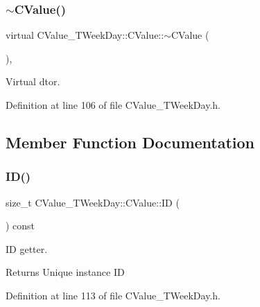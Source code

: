 \subsubsection{\texorpdfstring{$\sim$\+C\+Value()}{~CValue()}}
{\footnotesize\ttfamily virtual C\+Value\+\_\+\+T\+Week\+Day\+::\+C\+Value\+::$\sim$\+C\+Value (\begin{DoxyParamCaption}{ }\end{DoxyParamCaption})\hspace{0.3cm}{\ttfamily [inline]}, {\ttfamily [virtual]}}



Virtual d\textquotesingle{}tor. 



Definition at line 106 of file C\+Value\+\_\+\+T\+Week\+Day.\+h.



\subsection{Member Function Documentation}
\mbox{\label{class_c_value___t_week_day_1_1_c_value_ac1441867813d4c170f416b8fe5894324}} 
\subsubsection{\texorpdfstring{I\+D()}{ID()}}
{\footnotesize\ttfamily size\+\_\+t C\+Value\+\_\+\+T\+Week\+Day\+::\+C\+Value\+::\+ID (\begin{DoxyParamCaption}{ }\end{DoxyParamCaption}) const\hspace{0.3cm}{\ttfamily [inline]}}



ID getter. 

\begin{DoxyReturn}{Returns}
Unique instance ID 
\end{DoxyReturn}


Definition at line 113 of file C\+Value\+\_\+\+T\+Week\+Day.\+h.

\mbox{\label{class_c_value___t_week_day_1_1_c_value_a22aa06908f1555784b3ff229c5a94da9}} 
